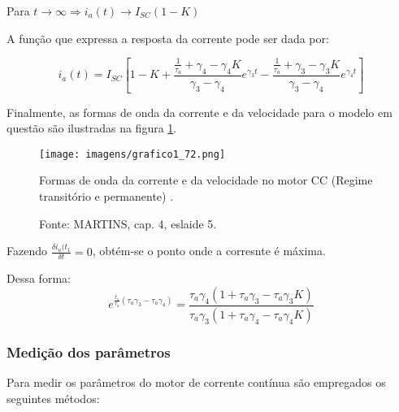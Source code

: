Para $t \rightarrow \infty \Rightarrow i_{a}(t) \rightarrow I_{SC}(1 - K)$

A função que expressa a resposta da corrente pode ser dada por:

\[i_{a}(t) = I_{SC}\left[1 - K + \frac{\frac{1}{\tau_{a}} + \gamma_{4} - \gamma_{4}K}{\gamma_{3} - \gamma_{4}}e^{\gamma_{3}t} - \frac{\frac{1}{\tau_{a}} + \gamma_{3} - \gamma_{3}K}{\gamma_{3} - \gamma_{4}}e^{\gamma_{4}t}\right]\]

Finalmente, as formas de onda da corrente e da velocidade para o modelo em questão são ilustradas na figura \ref{fig:G1_72}.

\begin{figure}[ht!]
\center
\texttt{[image: imagens/grafico1\_72.png]}
\caption{\label{fig:G1_72} Formas de onda da corrente e da velocidade no motor CC (Regime transitório e permanente) .}
\caption*{Fonte: MARTINS, cap. 4, eslaide 5.}
\end{figure}

Fazendo $\frac{\delta{i_{a}(t_{1}}}{\delta{t}} = 0$, obtém-se o ponto onde a corresnte é máxima.

Dessa forma:
\[ e^{\frac{t_{1}}{\tau_{a}}\left(\tau_{a}\gamma_{3} - \tau_{a}\gamma_{4}\right)} = \frac{\tau_{a}\gamma_{4}\left(1 + \tau_{a}\gamma_{3} - \tau_{a}\gamma_{3}K\right)}{\tau_{a}\gamma_{3}\left(1 + \tau_{a}\gamma_{4} - \tau_{a}\gamma_{4}K\right)}\]

\subsubsection{Medição dos parâmetros}

Para medir os parâmetros do motor de corrente contínua são empregados os seguintes métodos:

